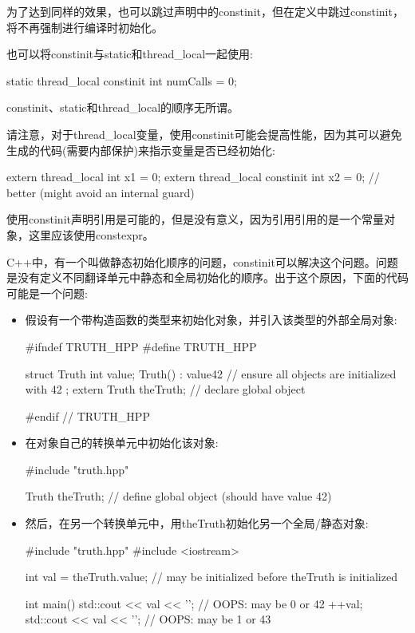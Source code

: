 为了达到同样的效果，也可以跳过声明中的constinit，但在定义中跳过constinit，将不再强制进行编译时初始化。

也可以将constinit与static和thread\_local一起使用:

\begin{cpp}
static thread_local constinit int numCalls = 0;
\end{cpp}

constinit、static和thread\_local的顺序无所谓。

请注意，对于thread\_local变量，使用constinit可能会提高性能，因为其可以避免生成的代码(需要内部保护)来指示变量是否已经初始化:

\begin{cpp}
extern thread_local int x1 = 0;
extern thread_local constinit int x2 = 0; // better (might avoid an internal guard)
\end{cpp}

使用constinit声明引用是可能的，但是没有意义，因为引用引用的是一个常量对象，这里应该使用constexpr。


C++中，有一个叫做静态初始化顺序的问题，constinit可以解决这个问题。问题是没有定义不同翻译单元中静态和全局初始化的顺序。出于这个原因，下面的代码可能是一个问题:

\begin{itemize}
\item 
假设有一个带构造函数的类型来初始化对象，并引入该类型的外部全局对象:


\begin{cpp}
#ifndef TRUTH_HPP
#define TRUTH_HPP

struct Truth {
	int value;
	Truth() : value{42} { // ensure all objects are initialized with 42
	}
};
extern Truth theTruth; // declare global object

#endif // TRUTH_HPP
\end{cpp}

\item
在对象自己的转换单元中初始化该对象:


\begin{cpp}
#include "truth.hpp"

Truth theTruth; // define global object (should have value 42)
\end{cpp}

\item
然后，在另一个转换单元中，用theTruth初始化另一个全局/静态对象:


\begin{cpp}
#include "truth.hpp"
#include <iostream>

int val = theTruth.value; // may be initialized before theTruth is initialized

int main()
{
	std::cout << val << '\n'; // OOPS: may be 0 or 42
	++val;
	std::cout << val << '\n'; // OOPS: may be 1 or 43
}
\end{cpp}
\end{itemize}

